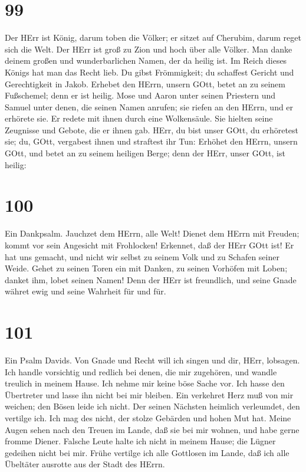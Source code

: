 \hypertarget{section-98}{%
\section{99}\label{section-98}}

 Der HErr ist König, darum toben die Völker; er sitzet auf
Cherubim, darum reget sich die Welt.  Der HErr ist groß zu
Zion und hoch über alle Völker.  Man danke deinem großen und
wunderbarlichen Namen, der da heilig ist.  Im Reich dieses
Königs hat man das Recht lieb. Du gibst Frömmigkeit; du schaffest
Gericht und Gerechtigkeit in Jakob.  Erhebet den HErrn,
unsern GOtt, betet an zu seinem Fußschemel; denn er ist heilig.
 Mose und Aaron unter seinen Priestern und Samuel unter
denen, die seinen Namen anrufen; sie riefen an den HErrn, und er
erhörete sie.  Er redete mit ihnen durch eine Wolkensäule.
Sie hielten seine Zeugnisse und Gebote, die er ihnen gab. 
HErr, du bist unser GOtt, du erhöretest sie; du, GOtt, vergabest ihnen
und straftest ihr Tun:  Erhöhet den HErrn, unsern GOtt, und
betet an zu seinem heiligen Berge; denn der HErr, unser GOtt, ist
heilig:

\hypertarget{section-99}{%
\section{100}\label{section-99}}

 Ein Dankpsalm. Jauchzet dem HErrn, alle Welt! 
Dienet dem HErrn mit Freuden; kommt vor sein Angesicht mit Frohlocken!
 Erkennet, daß der HErr GOtt ist! Er hat uns gemacht, und
nicht wir selbst zu seinem Volk und zu Schafen seiner Weide.
 Gehet zu seinen Toren ein mit Danken, zu seinen Vorhöfen
mit Loben; danket ihm, lobet seinen Namen!  Denn der HErr
ist freundlich, und seine Gnade währet ewig und seine Wahrheit für und
für.

\hypertarget{section-100}{%
\section{101}\label{section-100}}

 Ein Psalm Davids. Von Gnade und Recht will ich singen und
dir, HErr, lobsagen.  Ich handle vorsichtig und redlich bei
denen, die mir zugehören, und wandle treulich in meinem Hause.
 Ich nehme mir keine böse Sache vor. Ich hasse den
Übertreter und lasse ihn nicht bei mir bleiben.  Ein
verkehret Herz muß von mir weichen; den Bösen leide ich nicht.
 Der seinen Nächsten heimlich verleumdet, den vertilge ich.
Ich mag des nicht, der stolze Gebärden und hohen Mut hat. 
Meine Augen sehen nach den Treuen im Lande, daß sie bei mir wohnen, und
habe gerne fromme Diener.  Falsche Leute halte ich nicht in
meinem Hause; die Lügner gedeihen nicht bei mir.  Frühe
vertilge ich alle Gottlosen im Lande, daß ich alle Übeltäter ausrotte
aus der Stadt des HErrn.

